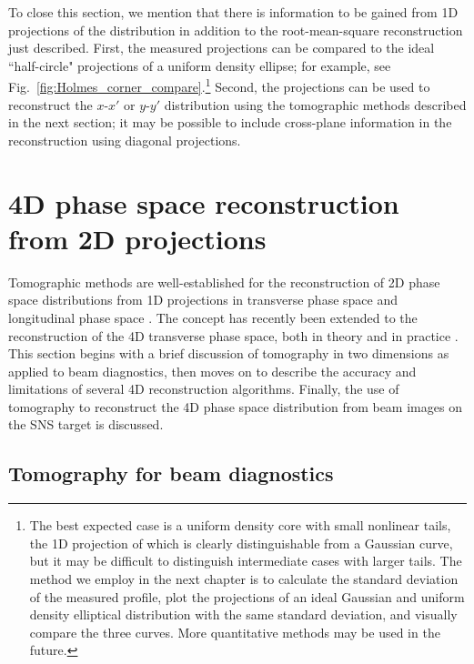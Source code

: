 To close this section, we mention that there is information to be gained from 1D projections of the distribution in addition to the root-mean-square reconstruction just described. First, the measured projections can be compared to the ideal ``half-circle" projections of a uniform density ellipse; for example, see Fig.~\ref{fig:Holmes_corner_compare}.\footnote{The best expected case is a uniform density core with small nonlinear tails, the 1D projection of which is clearly distinguishable from a Gaussian curve, but it may be difficult to distinguish intermediate cases with larger tails. The method we employ in the next chapter is to calculate the standard deviation of the measured profile, plot the projections of an ideal Gaussian and uniform density elliptical distribution with the same standard deviation, and visually compare the three curves. More quantitative methods may be used in the future.} Second, the projections can be used to reconstruct the $x$-$x'$ or $y$-$y'$ distribution using the tomographic methods described in the next section; it may be possible to include cross-plane information in the reconstruction using diagonal projections. 


\section{4D phase space reconstruction from 2D projections}

Tomographic methods are well-established for the reconstruction of 2D phase space distributions from 1D projections in transverse phase space \cite{Hock2014} and longitudinal phase space \cite{Evans2014}. The concept has recently been extended to the reconstruction of the 4D transverse phase space, both in theory and in practice \cite{Hock2013b, Wang2019, Wolski2020}. This section begins with a brief discussion of tomography in two dimensions as applied to beam diagnostics, then moves on to describe the accuracy and limitations of several 4D reconstruction algorithms. Finally, the use of tomography to reconstruct the 4D phase space distribution from beam images on the SNS target is discussed. 



\subsection{Tomography for beam diagnostics}

